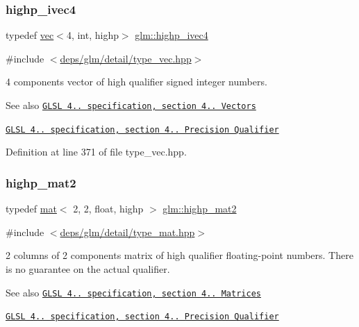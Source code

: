 \subsubsection{\texorpdfstring{highp\+\_\+ivec4}{highp\_ivec4}}
{\footnotesize\ttfamily typedef \hyperlink{structglm_1_1vec}{vec}$<$4, int, highp$>$ \hyperlink{group__core__precision_gaff761e336e3b52f04e725fa85c6d36d1}{glm\+::highp\+\_\+ivec4}}



{\ttfamily \#include $<$\hyperlink{type__vec_8hpp}{deps/glm/detail/type\+\_\+vec.\+hpp}$>$}

4 components vector of high qualifier signed integer numbers.

\begin{DoxySeeAlso}{See also}
\href{http://www.opengl.org/registry/doc/GLSLangSpec.4.20.8.pdf}{\tt G\+L\+SL 4.. specification, section 4.. Vectors} 

\href{http://www.opengl.org/registry/doc/GLSLangSpec.4.20.8.pdf}{\tt G\+L\+SL 4.. specification, section 4.. Precision Qualifier} 
\end{DoxySeeAlso}


Definition at line 371 of file type\+\_\+vec.\+hpp.

\mbox{\label{group__core__precision_gae7066dac53a008363d6faeabf46ccb03}} 
\subsubsection{\texorpdfstring{highp\+\_\+mat2}{highp\_mat2}}
{\footnotesize\ttfamily typedef \hyperlink{structglm_1_1mat}{mat}$<$ 2, 2, float, highp $>$ \hyperlink{group__core__precision_gae7066dac53a008363d6faeabf46ccb03}{glm\+::highp\+\_\+mat2}}



{\ttfamily \#include $<$\hyperlink{type__mat_8hpp}{deps/glm/detail/type\+\_\+mat.\+hpp}$>$}

2 columns of 2 components matrix of high qualifier floating-\/point numbers. There is no guarantee on the actual qualifier.

\begin{DoxySeeAlso}{See also}
\href{http://www.opengl.org/registry/doc/GLSLangSpec.4.20.8.pdf}{\tt G\+L\+SL 4.. specification, section 4.. Matrices} 

\href{http://www.opengl.org/registry/doc/GLSLangSpec.4.20.8.pdf}{\tt G\+L\+SL 4.. specification, section 4.. Precision Qualifier} 
\end{DoxySeeAlso}



